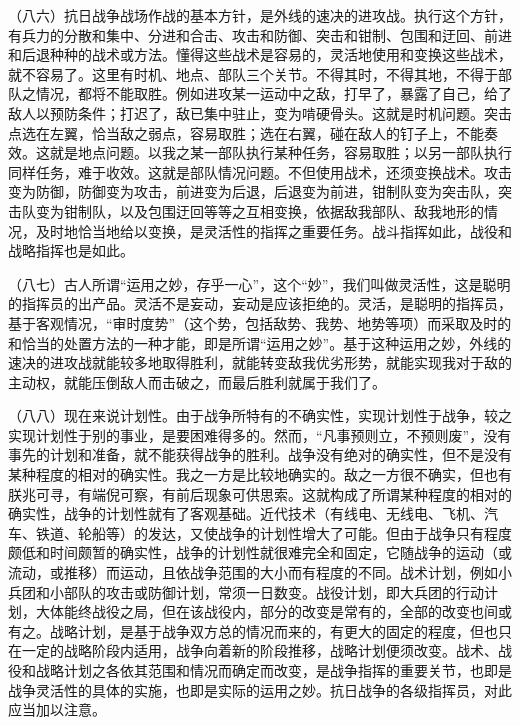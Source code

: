 （八六）抗日战争战场作战的基本方针，是外线的速决的进攻战。执行这个方针，有兵力的分散和集中、分进和合击、攻击和防御、突击和钳制、包围和迂回、前进和后退种种的战术或方法。懂得这些战术是容易的，灵活地使用和变换这些战术，就不容易了。这里有时机、地点、部队三个关节。不得其时，不得其地，不得于部队之情况，都将不能取胜。例如进攻某一运动中之敌，打早了，暴露了自己，给了敌人以预防条件；打迟了，敌已集中驻止，变为啃硬骨头。这就是时机问题。突击点选在左翼，恰当敌之弱点，容易取胜；选在右翼，碰在敌人的钉子上，不能奏效。这就是地点问题。以我之某一部队执行某种任务，容易取胜；以另一部队执行同样任务，难于收效。这就是部队情况问题。不但使用战术，还须变换战术。攻击变为防御，防御变为攻击，前进变为后退，后退变为前进，钳制队变为突击队，突击队变为钳制队，以及包围迂回等等之互相变换，依据敌我部队、敌我地形的情况，及时地恰当地给以变换，是灵活性的指挥之重要任务。战斗指挥如此，战役和战略指挥也是如此。

（八七）古人所谓“运用之妙，存乎一心”，这个“妙”，我们叫做灵活性，这是聪明的指挥员的出产品。灵活不是妄动，妄动是应该拒绝的。灵活，是聪明的指挥员，基于客观情况，“审时度势”（这个势，包括敌势、我势、地势等项）而采取及时的和恰当的处置方法的一种才能，即是所谓“运用之妙”。基于这种运用之妙，外线的速决的进攻战就能较多地取得胜利，就能转变敌我优劣形势，就能实现我对于敌的主动权，就能压倒敌人而击破之，而最后胜利就属于我们了。

（八八）现在来说计划性。由于战争所特有的不确实性，实现计划性于战争，较之实现计划性于别的事业，是要困难得多的。然而，“凡事预则立，不预则废”，没有事先的计划和准备，就不能获得战争的胜利。战争没有绝对的确实性，但不是没有某种程度的相对的确实性。我之一方是比较地确实的。敌之一方很不确实，但也有朕兆可寻，有端倪可察，有前后现象可供思索。这就构成了所谓某种程度的相对的确实性，战争的计划性就有了客观基础。近代技术（有线电、无线电、飞机、汽车、铁道、轮船等）的发达，又使战争的计划性增大了可能。但由于战争只有程度颇低和时间颇暂的确实性，战争的计划性就很难完全和固定，它随战争的运动（或流动，或推移）而运动，且依战争范围的大小而有程度的不同。战术计划，例如小兵团和小部队的攻击或防御计划，常须一日数变。战役计划，即大兵团的行动计划，大体能终战役之局，但在该战役内，部分的改变是常有的，全部的改变也间或有之。战略计划，是基于战争双方总的情况而来的，有更大的固定的程度，但也只在一定的战略阶段内适用，战争向着新的阶段推移，战略计划便须改变。战术、战役和战略计划之各依其范围和情况而确定而改变，是战争指挥的重要关节，也即是战争灵活性的具体的实施，也即是实际的运用之妙。抗日战争的各级指挥员，对此应当加以注意。


